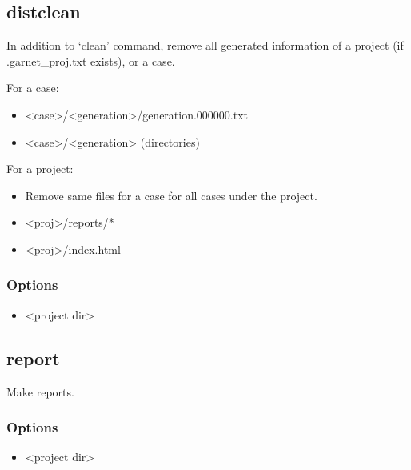 \documentclass[]{article}
\begin{document}
\subsection{distclean}\label{distclean}

In addition to `clean' command, remove all generated information of a
project (if .garnet\_proj.txt exists), or a case.

For a case:

\begin{itemize}
\itemsep1pt\parskip0pt
\item
  \textless{}case\textgreater{}/\textless{}generation\textgreater{}/generation.000000.txt
\item
  \textless{}case\textgreater{}/\textless{}generation\textgreater{}
  (directories)
\end{itemize}

For a project:

\begin{itemize}
\itemsep1pt\parskip0pt
\item
  Remove same files for a case for all cases under the project.
\item
  \textless{}proj\textgreater{}/reports/*
\item
  \textless{}proj\textgreater{}/index.html
\end{itemize}

\subsubsection{Options}\label{options-5}

\begin{itemize}
\itemsep1pt\parskip0pt
\item
  \textless{}project dir\textgreater{}
\end{itemize}

\subsection{report}\label{report}

Make reports.

\subsubsection{Options}\label{options-6}

\begin{itemize}
\itemsep1pt\parskip0pt
\item
  \textless{}project dir\textgreater{}
\end{itemize}
\end{document}
